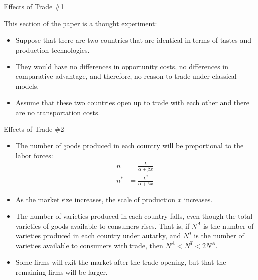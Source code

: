 \documentclass[aspectratio=169]{beamer}
\begin{document}

\begin{frame}{Effects of Trade \#1}

This section of the paper is a thought experiment:
\begin{itemize}
    \item<1-> Suppose that there are two countries that are identical in terms of tastes and production technologies.
    \item<2-> They would have no differences in opportunity costs, no differences in comparative advantage, and therefore, no reason to trade under classical models.
    \item<3-> Assume that these two countries open up to trade with each other and there are no transportation costs.
\end{itemize}
    
\end{frame}


\begin{frame}{Effects of Trade \#2}

\begin{itemize}
    \item<1-> The number of goods produced in each country will be proportional to the labor forces:
    \begin{equation*}
        \begin{split}
            n &= \frac{L}{\alpha + \beta x} \\
            n^{*} &= \frac{L^{*}}{\alpha + \beta x}
        \end{split}
    \end{equation*}
    \item<2-> As the market size increases, the scale of production $ x $ increases.
    \item<3-> The number of varieties produced in each country falls, even though the total varieties of goods available to consumers rises.  That is, if  $ N^{A} $ is the number of varieties produced in each country under autarky, and $ N^{T} $ is the number of varieties available to consumers with trade, then $ N^{A} < N^{T} < 2N^{A} $.
    \item<4-> Some firms will exit the market after the trade opening, but that the remaining firms will be larger.
\end{itemize}
    
\end{frame}
\end{document}
